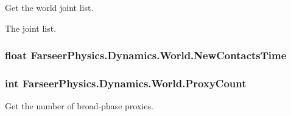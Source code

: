 Get the world joint list. 

The joint list.\hypertarget{class_farseer_physics_1_1_dynamics_1_1_world_a3e5b1b784859654686eb13b01006f329}{
\subsubsection[{New\+Contacts\+Time}]{\setlength{\rightskip}{0pt plus 5cm}float Farseer\+Physics.\+Dynamics.\+World.\+New\+Contacts\+Time\hspace{0.3cm}{\ttfamily [get]}}}\label{class_farseer_physics_1_1_dynamics_1_1_world_a3e5b1b784859654686eb13b01006f329}
\hypertarget{class_farseer_physics_1_1_dynamics_1_1_world_a5a99bf76957ac263a5a4fce8b3e960ee}{
\subsubsection[{Proxy\+Count}]{\setlength{\rightskip}{0pt plus 5cm}int Farseer\+Physics.\+Dynamics.\+World.\+Proxy\+Count\hspace{0.3cm}{\ttfamily [get]}}}\label{class_farseer_physics_1_1_dynamics_1_1_world_a5a99bf76957ac263a5a4fce8b3e960ee}


Get the number of broad-\/phase proxies. 

